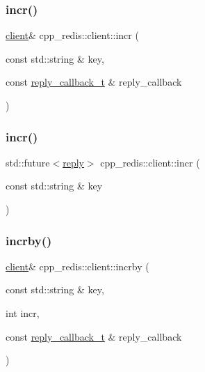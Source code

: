 \mbox{\label{classcpp__redis_1_1client_a2f9ba6c7e83451207403096b19da4faa}} 
\subsubsection{\texorpdfstring{incr()}{incr()}\hspace{0.1cm}{\footnotesize\ttfamily [1/2]}}
{\footnotesize\ttfamily \hyperlink{classcpp__redis_1_1client}{client}\& cpp\+\_\+redis\+::client\+::incr (\begin{DoxyParamCaption}\item[{const std\+::string \&}]{key,  }\item[{const \hyperlink{classcpp__redis_1_1client_a061a1140d36d2eaeda82b09a0bb3f9f2}{reply\+\_\+callback\+\_\+t} \&}]{reply\+\_\+callback }\end{DoxyParamCaption})}

\mbox{\label{classcpp__redis_1_1client_a36ce71119f98cdc29fb29ca33c8b1ff1}} 
\subsubsection{\texorpdfstring{incr()}{incr()}\hspace{0.1cm}{\footnotesize\ttfamily [2/2]}}
{\footnotesize\ttfamily std\+::future$<$\hyperlink{classcpp__redis_1_1reply}{reply}$>$ cpp\+\_\+redis\+::client\+::incr (\begin{DoxyParamCaption}\item[{const std\+::string \&}]{key }\end{DoxyParamCaption})}

\mbox{\label{classcpp__redis_1_1client_a7ee625ebbbfc9fb6f9821b94055e0a5c}} 
\subsubsection{\texorpdfstring{incrby()}{incrby()}\hspace{0.1cm}{\footnotesize\ttfamily [1/2]}}
{\footnotesize\ttfamily \hyperlink{classcpp__redis_1_1client}{client}\& cpp\+\_\+redis\+::client\+::incrby (\begin{DoxyParamCaption}\item[{const std\+::string \&}]{key,  }\item[{int}]{incr,  }\item[{const \hyperlink{classcpp__redis_1_1client_a061a1140d36d2eaeda82b09a0bb3f9f2}{reply\+\_\+callback\+\_\+t} \&}]{reply\+\_\+callback }\end{DoxyParamCaption})}

